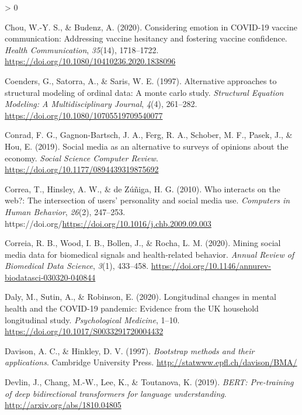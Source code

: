 \documentclass[
  english,
  jou,floatsintext]{apa7}
\newlength{\cslhangindent}
\newenvironment{CSLReferences}[2] %
 {%
  \setlength{\parindent}{0pt}
  \ifodd #1 \everypar{\setlength{\hangindent}{\cslhangindent}}\ignorespaces\fi
  \ifnum #2 > 0
  \setlength{\parskip}{#2\baselineskip}
  \fi
 }%
 {}
\begin{document}
\begin{CSLReferences}{1}{0}
\leavevmode\hypertarget{ref-Chou2020}{}%
Chou, W.-Y. S., \& Budenz, A. (2020). Considering emotion in COVID-19 vaccine communication: Addressing vaccine hesitancy and fostering vaccine confidence. \emph{Health Communication}, \emph{35}(14), 1718--1722. \url{https://doi.org/10.1080/10410236.2020.1838096}

\leavevmode\hypertarget{ref-Coenders1997}{}%
Coenders, G., Satorra, A., \& Saris, W. E. (1997). Alternative approaches to structural modeling of ordinal data: A monte carlo study. \emph{Structural Equation Modeling: A Multidisciplinary Journal}, \emph{4}(4), 261--282. \url{https://doi.org/10.1080/10705519709540077}

\leavevmode\hypertarget{ref-Frederick_2019}{}%
Conrad, F. G., Gagnon-Bartsch, J. A., Ferg, R. A., Schober, M. F., Pasek, J., \& Hou, E. (2019). Social media as an alternative to surveys of opinions about the economy. \emph{Social Science Computer Review}. \url{https://doi.org/10.1177/0894439319875692}

\leavevmode\hypertarget{ref-Correa2010}{}%
Correa, T., Hinsley, A. W., \& de Zúñiga, H. G. (2010). Who interacts on the web?: The intersection of users' personality and social media use. \emph{Computers in Human Behavior}, \emph{26}(2), 247--253. https://doi.org/\url{https://doi.org/10.1016/j.chb.2009.09.003}

\leavevmode\hypertarget{ref-Correia2020}{}%
Correia, R. B., Wood, I. B., Bollen, J., \& Rocha, L. M. (2020). Mining social media data for biomedical signals and health-related behavior. \emph{Annual Review of Biomedical Data Science}, \emph{3}(1), 433--458. \url{https://doi.org/10.1146/annurev-biodatasci-030320-040844}

\leavevmode\hypertarget{ref-Daly2020}{}%
Daly, M., Sutin, A., \& Robinson, E. (2020). Longitudinal changes in mental health and the COVID-19 pandemic: Evidence from the UK household longitudinal study. \emph{Psychological Medicine}, 1--10. \url{https://doi.org/10.1017/S0033291720004432}

\leavevmode\hypertarget{ref-R-boot}{}%
Davison, A. C., \& Hinkley, D. V. (1997). \emph{Bootstrap methods and their applications}. Cambridge University Press. \url{http://statwww.epfl.ch/davison/BMA/}

\leavevmode\hypertarget{ref-devlin2019}{}%
Devlin, J., Chang, M.-W., Lee, K., \& Toutanova, K. (2019). \emph{BERT: Pre-training of deep bidirectional transformers for language understanding}. \url{http://arxiv.org/abs/1810.04805}


\end{CSLReferences}
\end{document}
